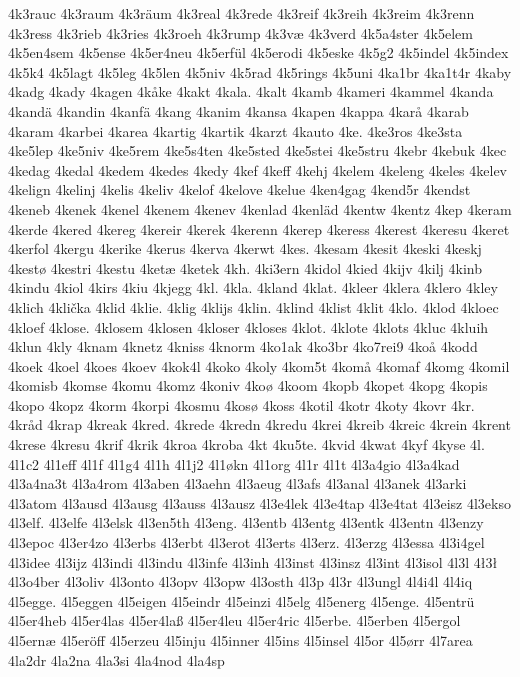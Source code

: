 4k3rauc
4k3raum
4k3räum
4k3real
4k3rede
4k3reif
4k3reih
4k3reim
4k3renn
4k3ress
4k3rieb
4k3ries
4k3roeh
4k3rump
4k3væ
4k3verd
4k5a4ster
4k5elem
4k5en4sem
4k5ense
4k5er4neu
4k5erfül
4k5erodi
4k5eske
4k5g2
4k5indel
4k5index
4k5k4
4k5lagt
4k5leg
4k5len
4k5niv
4k5rad
4k5rings
4k5uni
4ka1br
4ka1t4r
4kaby
4kadg
4kady
4kagen
4kåke
4kakt
4kala.
4kalt
4kamb
4kameri
4kammel
4kanda
4kandä
4kandin
4kanfä
4kang
4kanim
4kansa
4kapen
4kappa
4karå
4karab
4karam
4karbei
4karea
4kartig
4kartik
4karzt
4kauto
4ke.
4ke3ros
4ke3sta
4ke5lep
4ke5niv
4ke5rem
4ke5s4ten
4ke5sted
4ke5stei
4ke5stru
4kebr
4kebuk
4kec
4kedag
4kedal
4kedem
4kedes
4kedy
4kef
4keff
4kehj
4kelem
4keleng
4keles
4kelev
4kelign
4kelinj
4kelis
4keliv
4kelof
4kelove
4kelue
4ken4gag
4kend5r
4kendst
4keneb
4kenek
4kenel
4kenem
4kenev
4kenlad
4kenläd
4kentw
4kentz
4kep
4keram
4kerde
4kered
4kereg
4kereir
4kerek
4kerenn
4kerep
4keress
4kerest
4keresu
4keret
4kerfol
4kergu
4kerike
4kerus
4kerva
4kerwt
4kes.
4kesam
4kesit
4keski
4keskj
4kestø
4kestri
4kestu
4ketæ
4ketek
4kh.
4ki3ern
4kidol
4kied
4kijv
4kilj
4kinb
4kindu
4kiol
4kirs
4kiu
4kjegg
4kl.
4kla.
4kland
4klat.
4kleer
4klera
4klero
4kley
4klich
4klička
4klid
4klie.
4klig
4klijs
4klin.
4klind
4klist
4klit
4klo.
4klod
4kloec
4kloef
4klose.
4klosem
4klosen
4kloser
4kloses
4klot.
4klote
4klots
4kluc
4kluih
4klun
4kly
4knam
4knetz
4kniss
4knorm
4ko1ak
4ko3br
4ko7rei9
4koå
4kodd
4koek
4koel
4koes
4koev
4kok4l
4koko
4koly
4kom5t
4komå
4komaf
4komg
4komil
4komisb
4komse
4komu
4komz
4koniv
4koø
4koom
4kopb
4kopet
4kopg
4kopis
4kopo
4kopz
4korm
4korpi
4kosmu
4kosø
4koss
4kotil
4kotr
4koty
4kovr
4kr.
4kråd
4krap
4kreak
4kred.
4krede
4kredn
4kredu
4krei
4kreib
4kreic
4krein
4krent
4krese
4kresu
4krif
4krik
4kroa
4kroba
4kt
4ku5te.
4kvid
4kwat
4kyf
4kyse
4l.
4l1c2
4l1eff
4l1f
4l1g4
4l1h
4l1j2
4l1økn
4l1org
4l1r
4l1t
4l3a4gio
4l3a4kad
4l3a4na3t
4l3a4rom
4l3aben
4l3aehn
4l3aeug
4l3afs
4l3anal
4l3anek
4l3arki
4l3atom
4l3ausd
4l3ausg
4l3auss
4l3ausz
4l3e4lek
4l3e4tap
4l3e4tat
4l3eisz
4l3ekso
4l3elf.
4l3elfe
4l3elsk
4l3en5th
4l3eng.
4l3entb
4l3entg
4l3entk
4l3entn
4l3enzy
4l3epoc
4l3er4zo
4l3erbs
4l3erbt
4l3erot
4l3erts
4l3erz.
4l3erzg
4l3essa
4l3i4gel
4l3idee
4l3ijz
4l3indi
4l3indu
4l3infe
4l3inh
4l3inst
4l3insz
4l3int
4l3isol
4l3l
4ł3ł
4l3o4ber
4l3oliv
4l3onto
4l3opv
4l3opw
4l3osth
4l3p
4l3r
4l3ungl
4l4i4l
4l4iq
4l5egge.
4l5eggen
4l5eigen
4l5eindr
4l5einzi
4l5elg
4l5energ
4l5enge.
4l5entrü
4l5er4heb
4l5er4las
4l5er4laß
4l5er4leu
4l5er4ric
4l5erbe.
4l5erben
4l5ergol
4l5ernæ
4l5eröff
4l5erzeu
4l5inju
4l5inner
4l5ins
4l5insel
4l5or
4l5ørr
4l7area
4la2dr
4la2na
4la3si
4la4nod
4la4sp

